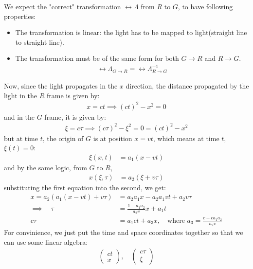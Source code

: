 We expect the "correct" transformation $\rel{\Lambda}$ from $R$ to $G$, to have following properties:
\begin{itemize}
  \item The transformation is linear: the light has to be mapped to light(straight line to straight line).
  \item The transformation must be of the same form for both $G \to R$ and $R \to G$.
        \begin{align}
          \rel{\Lambda}_{G \to R} = \rel{\Lambda}^{-1}_{R \to G}
        \end{align}
\end{itemize}
Now, since the light propagates in the $x$ direction, the distance propagated by the light in the $R$ frame is given by:
\begin{align}
  x = ct \implies (ct)^2 - x^2 = 0
\end{align}
and in the $G$ frame, it is given by:
\begin{align}
  \xi = c\tau \implies (c\tau)^2 - \xi^2 = 0 = (ct)^2 - x^2 \label{eq:light-propagation}
\end{align}
but at time $t$, the origin of $G$ is at position $x = vt$, which means at time $t$, $\xi(t) = 0$:
\begin{align}
  \xi(x, t) & = a_1(x - vt)
\end{align}
and by the same logic, from $G$ to $R$,
\begin{align}
  x(\xi, \tau) & = a_2(\xi + v \tau)
\end{align}
substituting the first equation into the second, we get:
\begin{align}
  x = a_2 (a_1(x - vt) + v \tau) & = a_2 a_1 x - a_2 a_1 v t + a_2 v \tau                                   \\
  \implies \quad \tau            & = \frac{1 - a_1 a_2}{a_2 v} x + a_1 t                                    \\
  c \tau                         & = a_1 ct + a_3 x, \quad \text{where  } a_3 = \frac{c - c a_1 a_2}{a_2 v}
\end{align}
For convinience, we just put the time and space coordinates together so that we can use some linear algebra:
\begin{align}
  \begin{pmatrix}
    ct \\
    x
  \end{pmatrix}, \quad \begin{pmatrix}
                         c \tau \\
                         \xi
                       \end{pmatrix}
\end{align}
